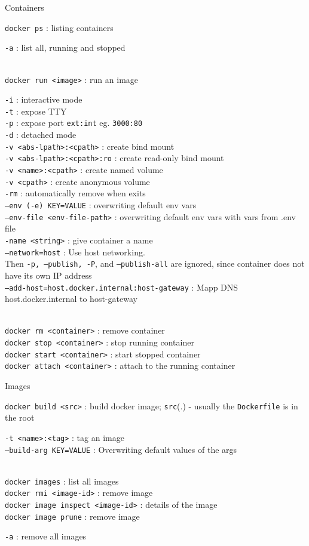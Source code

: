 \documentclass[10pt]{article}
\newcommand{\code}[1]{{\color{teal}\texttt{#1}}}
\newcommand{\cmd}[3][.3]{\code{#2} : #3 \\[#1em]}
\newcommand{\opts}[2][.5]{\hspace*{.5cm}\begin{minipage}{0.9\textwidth}
  #2
  \vspace*{-1em}
\end{minipage}\\[#1em]}
\newcommand{\cluster}[2]{\begin{mybox}{#1}
  #2
  \vspace*{-1.3em}
\end{mybox}}
\begin{document}
\begin{multicols*}{2}

  \cluster{Containers}{
    \cmd{docker ps}{listing containers}
    \opts{
      \code{-a} : list all, running and stopped \\
    }
    \cmd{docker run <image>}{run an image}
    \opts{
      \code{-i} : interactive mode \\
      \code{-t} : expose TTY \\
      \code{-p} : expose port \code{ext:int} eg. \code{3000:80} \\
      \code{-d} : detached mode \\
      \code{-v <abs-lpath>:<cpath>} : create bind mount \\
      \code{-v <abs-lpath>:<cpath>:ro} : create read-only bind mount \\
      \code{-v <name>:<cpath>} : create named volume \\
      \code{-v <cpath>} : create anonymous volume \\
      \code{-rm} : automatically remove when exits \\
      \code{---env (-e) KEY=VALUE} : overwriting default env vars \\
      \cmd{---env-file <env-file-path>}{overwriting default env vars with vars from .env file}
      \code{-name <string>} : give container a name \\
      \cmd{---network=host}{Use host networking. \\ Then \code{-p, --publish, -P}, and \code{--publish-all} are ignored, since container does not have its own IP address}
      \cmd{---add-host=host.docker.internal:host-gateway}{Mapp DNS host.docker.internal to host-gateway}
    }
    \code{docker rm <container>} : remove container \\[.3em]
    \code{docker stop <container>} : stop running container \\[.3em]
    \code{docker start <container>} : start stopped container \\[.3em]
    \code{docker attach <container>} : attach to the running container \\[.3em]
  }

  \cluster{Images}{
    \cmd{docker build <src>}{build docker image; \code{src}(.) - usually the \code{Dockerfile} is in the root}
    \opts{
      \code{-t <name>:<tag>} : tag an image \\
      \cmd{---build-arg KEY=VALUE}{Overwriting default values of the args}
    }
    \code{docker images} : list all images \\[.3em]
    \code{docker rmi <image-id>} : remove image \\[.3em]
    \code{docker image inspect <image-id>} : details of the image\\[.3em]
    \code{docker image prune} : remove image \\[.3em]
    \opts{
      \code{-a} : remove all images \\
    }
  }


\end{multicols*}
\end{document}
